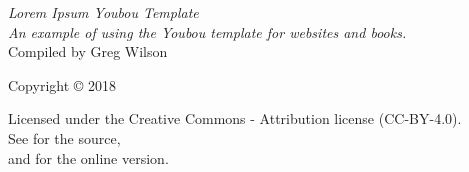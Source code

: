 \pagestyle{empty}

{\begingroup
  \raggedleft
  \vspace*{\baselineskip}

  {\Huge\itshape Lorem Ipsum Youbou Template}\\[\baselineskip]

  {\large\itshape
    An example of using the Youbou template for websites and books.
  }\\[0.2\textheight]

  {\large Compiled by Greg Wilson}\par

  \vfill

  {\large Copyright {\copyright} 2018}

  \vspace*{\baselineskip}

  {\small
    Licensed under the Creative Commons - Attribution license (CC-BY-4.0).
    \\
    See {\repository} for the source,\\
    and {\website} for the online version.
  }

\endgroup}

\newpage

\pagestyle{empty}

~

\newpage

\tableofcontents

\newpage

\pagestyle{empty}

~

\newpage

\pagestyle{plain}
